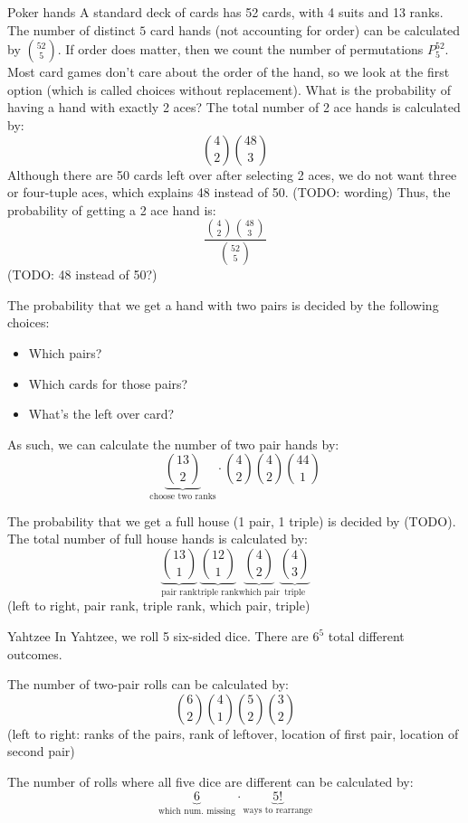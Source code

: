 \begin{exbox}{Poker hands}{}
    A standard deck of cards has 52 cards, with 4 suits and 13 ranks. The number of distinct $5$ card hands (not accounting for order) can be calculated by $\binom{52}{5}$. If order does matter, then we count the number of permutations $P_5^{52}$. Most card games don't care about the order of the hand, so we look at the first option (which is called choices without replacement).
    \tcblower
    What is the probability of having a hand with exactly 2 aces? The total number of 2 ace hands is calculated by:
    \[ \binom{4}{2} \binom{48}{3} \]
    Although there are 50 cards left over after selecting 2 aces, we do not want three or four-tuple aces, which explains 48 instead of 50. (TODO: wording) Thus, the probability of getting a 2 ace hand is:
    \[ \frac{\binom{4}{2} \binom{48}{3}}{\binom{52}{5}} \] 
    (TODO: 48 instead of 50?)

    The probability that we get a hand with two pairs is decided by the following choices:
    \begin{itemize}
        \item Which pairs?
        \item Which cards for those pairs?
        \item What's the left over card?
    \end{itemize}
    As such, we can calculate the number of two pair hands by:
    \[ \underbrace{\binom{13}{2}}_\text{choose two ranks} \cdot \binom{4}{2} \binom{4}{2} \binom{44}{1} \]

    The probability that we get a full house (1 pair, 1 triple) is decided by (TODO). The total number of full house hands is calculated by:
    \[ \underbrace{\binom{13}{1}}_\text{pair rank} \underbrace{\binom{12}{1}}_\text{triple rank} \underbrace{\binom{4}{2}}_\text{which pair} \underbrace{\binom{4}{3}}_\text{triple} \]
    (left to right, pair rank, triple rank, which pair, triple)
\end{exbox}

\begin{exbox}{Yahtzee}{}
    In Yahtzee, we roll 5 six-sided dice. There are $6^5$ total different outcomes. 

    The number of two-pair rolls can be calculated by:
    \[ \binom{6}{2} \binom{4}{1} \binom{5}{2} \binom{3}{2} \]
    (left to right: ranks of the pairs, rank of leftover, location of first pair, location of second pair)

    The number of rolls where all five dice are different can be calculated by:
    \[ \underbrace{6}_\text{which num. missing} \cdot \underbrace{5!}_\text{ways to rearrange} \]
\end{exbox}

